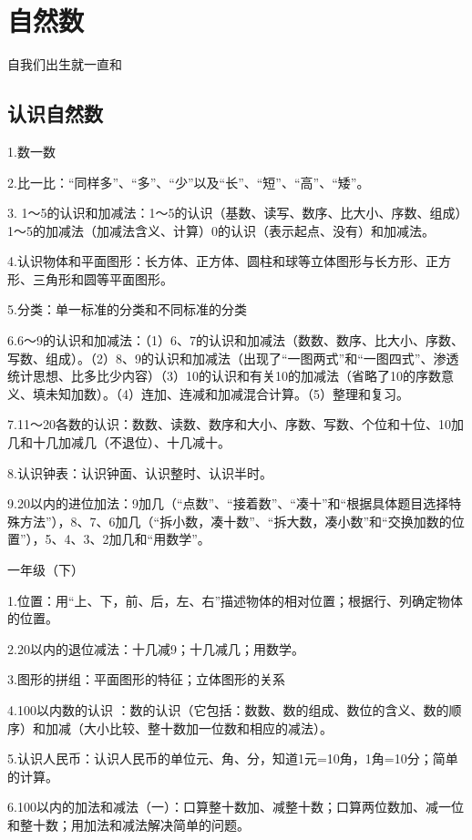 \chapter{自然数}

自我们出生就一直和

\section{认识自然数}

1.数一数

2.比一比：“同样多”、“多”、“少”以及“长”、“短”、“高”、“矮”。

3. 1～5的认识和加减法：1～5的认识（基数、读写、数序、比大小、序数、组成）1～5的加减法（加减法含义、计算）0的认识（表示起点、没有）和加减法。

4.认识物体和平面图形：长方体、正方体、圆柱和球等立体图形与长方形、正方形、三角形和圆等平面图形。

5.分类：单一标准的分类和不同标准的分类

6.6～9的认识和加减法：（1）6、7的认识和加减法（数数、数序、比大小、序数、写数、组成）。（2）8、9的认识和加减法（出现了“一图两式”和“一图四式”、渗透统计思想、比多比少内容）（3）10的认识和有关10的加减法（省略了10的序数意义、填未知加数）。（4）连加、连减和加减混合计算。（5）整理和复习。

7.11～20各数的认识：数数、读数、数序和大小、序数、写数、个位和十位、10加几和十几加减几（不退位）、十几减十。

8.认识钟表：认识钟面、认识整时、认识半时。

9.20以内的进位加法：9加几（“点数”、“接着数”、“凑十”和“根据具体题目选择特殊方法”），8、7、6加几（“拆小数，凑十数”、“拆大数，凑小数”和“交换加数的位置”），5、4、3、2加几和“用数学”。

一年级（下）

1.位置：用“上、下，前、后，左、右”描述物体的相对位置；根据行、列确定物体的位置。

2.20以内的退位减法：十几减9；十几减几；用数学。

3.图形的拼组：平面图形的特征；立体图形的关系

4.100以内数的认识 ：数的认识（它包括：数数、数的组成、数位的含义、数的顺序）和加减（大小比较、整十数加一位数和相应的减法）。

5.认识人民币：认识人民币的单位元、角、分，知道1元=10角，1角=10分；简单的计算。

6.100以内的加法和减法（一）：口算整十数加、减整十数；口算两位数加、减一位和整十数；用加法和减法解决简单的问题。

